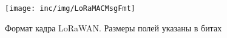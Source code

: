 \begin{figure}[!h]
  \centering
  \texttt{[image: inc/img/LoRaMACMsgFmt]}
  \caption{Формат кадра LoRaWAN. Размеры полей указаны в битах\cite{augustin2016}}
  \label{fig:macframe}
\end{figure}



\iffalse

\section{Примеры применения технологии LoRa в концепции Интернета вещей}

\subsection{Умный светильник}

\subsection{Умный счётчик}


\section{Преимущества и недостатки в сравнении с другими технологиями}

\subsection{Sigfox}

\subsection{XNB (Стриж)}

\subsection{NB-Fi}

\subsection{LTE/UMTS/GSM}

\fi

